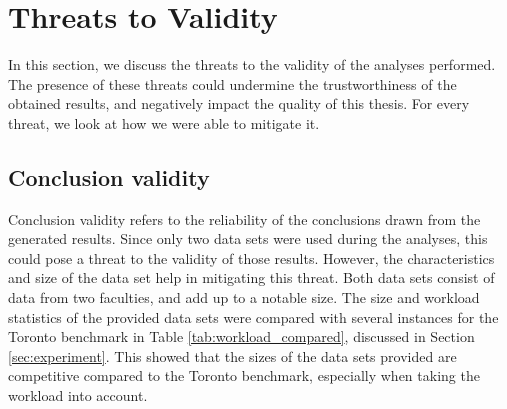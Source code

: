 
\section{Threats to Validity}\label{sec:threats}

In this section, we discuss the threats to the validity of the analyses performed. The presence of these threats could undermine the trustworthiness of the obtained results, and negatively impact the quality of this thesis. For every threat, we look at how we were able to mitigate it.




\subsection{Conclusion validity}

Conclusion validity refers to the reliability of the conclusions drawn from the generated results. Since only two data sets were used during the analyses, this could pose a threat to the validity of those results. However, the characteristics and size of the data set help in mitigating this threat. Both data sets consist of data from two faculties, and add up to a notable size. The size and workload statistics of the provided data sets were compared with several instances for the Toronto benchmark in Table \ref{tab:workload_compared}, discussed in Section \ref{sec:experiment}. This showed that the sizes of the data sets provided are competitive compared to the Toronto benchmark, especially when taking the workload into account.



